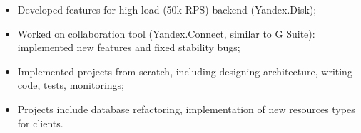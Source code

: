 \begin{itemize}
    \item Developed features for high-load (50k RPS) backend (Yandex.Disk);
    \item Worked on collaboration tool (Yandex.Connect, similar to G Suite): implemented new features and fixed stability bugs;
    \item Implemented projects from scratch, including designing architecture, writing code, tests, monitorings;
    \item Projects include database refactoring, implementation of new resources types for clients.
\end{itemize}
